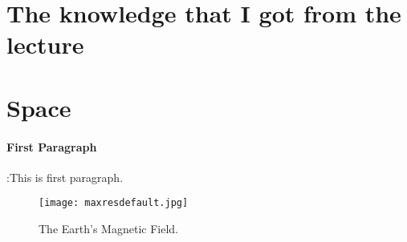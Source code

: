 \section*{The knowledge that I got from the lecture}
\section*{Space}
\paragraph*{First Paragraph}:This is first paragraph\cite{lecture}.\\

\begin{figure}
  \texttt{[image: maxresdefault.jpg]}
  \caption{The Earth's Magnetic Field.}
  \label{fig:magField}
   \cite{magEarth}
\end{figure}


